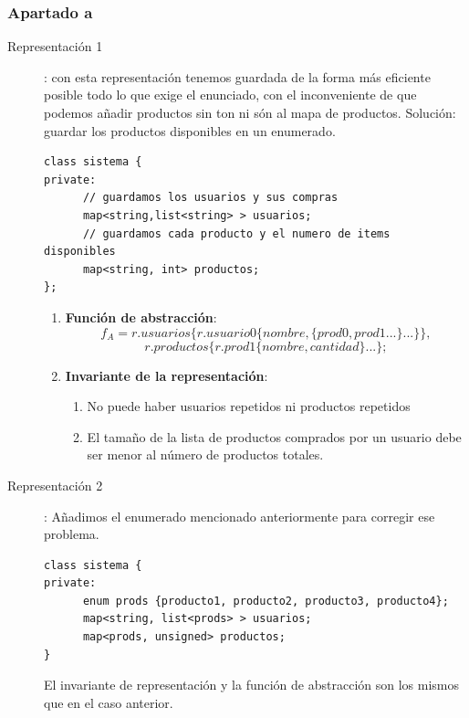 \documentclass[10pt,a4paper,spanish]{report}
\begin{document}
\subsubsection{\textcolor[rgb]{0.5,0.8,1}Apartado a}
\begin{description}
\item[Representación 1]: con esta representación tenemos guardada de la forma más eficiente posible todo lo que exige el enunciado, con el inconveniente de que podemos añadir productos sin ton ni són al mapa de productos. Solución: guardar los productos disponibles en un enumerado.
\begin{verbatim}
class sistema {
private:
      // guardamos los usuarios y sus compras
      map<string,list<string> > usuarios;
      // guardamos cada producto y el numero de items disponibles
      map<string, int> productos;
};
\end{verbatim}
\begin{enumerate}[$\clubsuit$]
\item \textbf{\textcolor[rgb]{0.5,0.8,1}{Función de abstracción}}:
\begin{displaymath}
f_A = r.usuarios\{r.usuario0\{nombre, \{prod0, prod1...\}...\}\},
\end{displaymath}
\begin{displaymath}
      r.productos\{r.prod1\{nombre,cantidad\}...\};
\end{displaymath}
\item \textbf{\textcolor[rgb]{0.5,0.8,1}{Invariante de la representación}}:
\begin{enumerate}[$\longrightarrow$]
\item No puede haber usuarios repetidos ni productos repetidos
\item El tamaño de la lista de productos comprados por un usuario debe ser menor al número de productos totales.
\end{enumerate}
\end{enumerate}

\item[Representación 2]: Añadimos el enumerado mencionado anteriormente para corregir ese problema.
\begin{verbatim}
class sistema {
private:
      enum prods {producto1, producto2, producto3, producto4};
      map<string, list<prods> > usuarios;
      map<prods, unsigned> productos;
}
\end{verbatim}

\noindent
El invariante de representación y la función de abstracción son los mismos que en el caso anterior.
\end{description}
\end{document}
